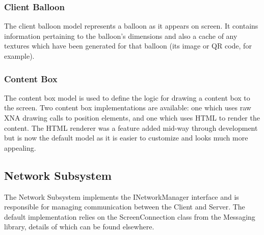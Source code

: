 \subsubsection{Client Balloon}
The client balloon model represents a balloon as it appears on screen. It 
contains information pertaining to the balloon's dimensions and also a cache of
any textures which have been generated for that balloon (its image or QR code, 
for example). 

\subsubsection{Content Box}
The content box model is used to define the logic for drawing a content box to
the screen. Two content box implementations are available: one which uses raw
XNA drawing calls to position elements, and one which uses HTML to render the
content. The HTML renderer was a feature added mid-way through development but
is now the default model as it is easier to customize and looks much more
appealing. 

\clearpage{}
\subsection{Network Subsystem}
The Network Subsystem implements the INetworkManager interface and is 
responsible for managing communication between the Client and Server. The 
default implementation relies on the ScreenConnection class from the Messaging
library, details of which can be found elsewhere. 


